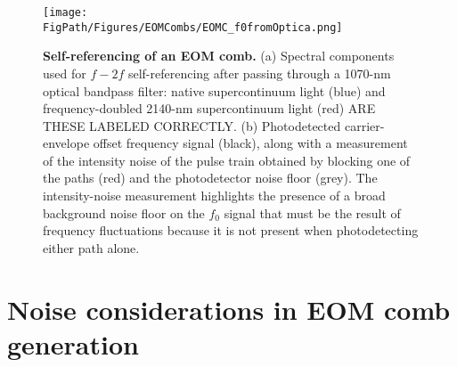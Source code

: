\begin{figure}[htpb]
	\begin{center}
		\texttt{[image: \\FigPath/Figures/EOMCombs/EOMC\_f0fromOptica.png]}
	\end{center}
	\caption[Self-referencing of an EOM comb]{\textbf{Self-referencing of an EOM comb.} (a) Spectral components used for $f-2f$ self-referencing after passing through a 1070-nm optical bandpass filter: \color{red}native supercontinuum light (blue) and frequency-doubled 2140-nm supercontinuum light (red) ARE THESE LABELED CORRECTLY\color{black}. (b) Photodetected carrier-envelope offset frequency signal (black), along with a measurement of the intensity noise of the pulse train obtained by \color{red} blocking one of the paths (red) \color{black}and the photodetector noise floor (grey). \color{red}The intensity-noise measurement highlights the presence of a broad background noise floor  on the $f_0$ signal that must be the result of frequency fluctuations because it is not present when photodetecting either path alone.\color{black}}
	\label{fig:EOMC_f0}
\end{figure} 



\section{Noise considerations in EOM comb generation}\label{sec:EOMCnoise}

